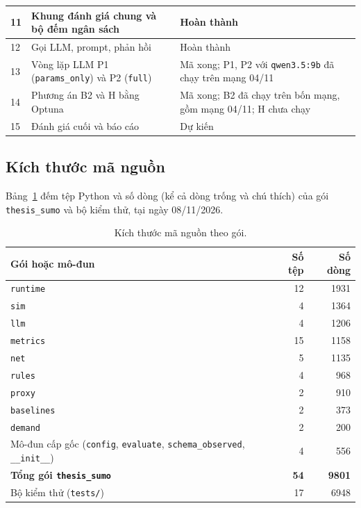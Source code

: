 \documentclass[../main.tex]{subfiles}
\begin{document}
\begin{table}[H]
\begin{tabular}{|p{0.8cm}|p{9.6cm}|p{2.6cm}|}
11 & Khung đánh giá chung và bộ đếm ngân sách & Hoàn thành \\ \hline
12 & Gọi LLM, prompt, phản hồi & Hoàn thành \\ \hline
13 & Vòng lặp LLM P1 (\texttt{params\_only}) và P2 (\texttt{full}) & Mã xong; P1, P2 với \texttt{qwen3.5:9b} đã chạy trên mạng 04/11 \\ \hline
14 & Phương án B2 và H bằng Optuna & Mã xong; B2 đã chạy trên bốn mạng, gồm mạng 04/11; H chưa chạy \\ \hline
15 & Đánh giá cuối và báo cáo & Dự kiến \\ \hline
\end{tabular}
\end{table}

\subsection{Kích thước mã nguồn}

Bảng~\ref{table:4.size} đếm tệp Python và số dòng (kể cả dòng trống và chú thích) của gói \texttt{thesis\_sumo} và bộ kiểm thử, tại ngày 08/11/2026.

\begin{table}[H]
\centering
\small
\caption{Kích thước mã nguồn theo gói.} \label{table:4.size}
\begin{tabular}{|l|r|r|}
\hline
\textbf{Gói hoặc mô-đun} & \textbf{Số tệp} & \textbf{Số dòng} \\ \hline
\texttt{runtime} & 12 & 1931 \\ \hline
\texttt{sim} & 4 & 1364 \\ \hline
\texttt{llm} & 4 & 1206 \\ \hline
\texttt{metrics} & 15 & 1158 \\ \hline
\texttt{net} & 5 & 1135 \\ \hline
\texttt{rules} & 4 & 968 \\ \hline
\texttt{proxy} & 2 & 910 \\ \hline
\texttt{baselines} & 2 & 373 \\ \hline
\texttt{demand} & 2 & 200 \\ \hline
Mô-đun cấp gốc (\texttt{config}, \texttt{evaluate}, \texttt{schema\_observed}, \texttt{\_\_init\_\_}) & 4 & 556 \\ \hline
\textbf{Tổng gói \texttt{thesis\_sumo}} & \textbf{54} & \textbf{9801} \\ \hline
Bộ kiểm thử (\texttt{tests/}) & 17 & 6948 \\ \hline
\end{tabular}
\end{table}
\end{document}
